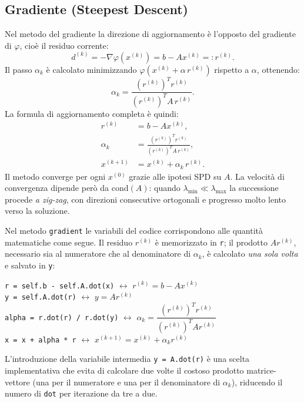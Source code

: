 \documentclass[a4paper,12pt]{article}
\begin{document}
\subsection{Gradiente (Steepest Descent)}
\label{subsec:grad}
 
Nel metodo del gradiente la direzione di aggiornamento è l'opposto del
gradiente di $\varphi$, cioè il residuo corrente:
\begin{equation}
    d^{(k)} = -\nabla\varphi(x^{(k)}) = b - Ax^{(k)} =: r^{(k)}.
\end{equation}
Il passo $\alpha_k$ è calcolato minimizzando $\varphi(x^{(k)} + \alpha\,r^{(k)})$
rispetto a $\alpha$, ottenendo:
\begin{equation}
    \alpha_k = \frac{(r^{(k)})^T r^{(k)}}{(r^{(k)})^T A\, r^{(k)}}.
    \label{eq:alpha_grad}
\end{equation}
La formula di aggiornamento completa è quindi:
\begin{align}
    r^{(k)}   &= b - A x^{(k)}, \\
    \alpha_k  &= \frac{(r^{(k)})^T r^{(k)}}{(r^{(k)})^T A\, r^{(k)}}, \\
    x^{(k+1)} &= x^{(k)} + \alpha_k\, r^{(k)}.
    \label{eq:grad_update}
\end{align}
Il metodo converge per ogni $x^{(0)}$ grazie alle ipotesi SPD su $A$. La velocità di convergenza dipende però da
$\mathrm{cond}(A)$: quando $\lambda_{\min} \ll \lambda_{\max}$ la successione
procede \emph{a zig-zag}, con direzioni consecutive ortogonali e progresso
molto lento verso la soluzione.

\begin{implbox}
Nel metodo \texttt{gradient} le variabili del codice corrispondono alle
quantità matematiche come segue. Il residuo $r^{(k)}$ è memorizzato in
\texttt{r}; il prodotto $Ar^{(k)}$, necessario sia al numeratore che al
denominatore di $\alpha_k$, è calcolato \emph{una sola volta} e salvato in
\texttt{y}:
\begin{center}
\texttt{r = self.b - self.A.dot(x)} \quad $\longleftrightarrow$ \quad $r^{(k)} = b - Ax^{(k)}$ \\[4pt]
\texttt{y = self.A.dot(r)} \quad $\longleftrightarrow$ \quad $y = Ar^{(k)}$ \\[4pt]
\texttt{alpha = r.dot(r) / r.dot(y)} \quad $\longleftrightarrow$ \quad $\alpha_k = \dfrac{(r^{(k)})^T r^{(k)}}{(r^{(k)})^T A r^{(k)}}$ \\[4pt]
\texttt{x = x + alpha * r} \quad $\longleftrightarrow$ \quad $x^{(k+1)} = x^{(k)} + \alpha_k r^{(k)}$
\end{center}
L'introduzione della variabile intermedia \texttt{y = A.dot(r)} è una scelta
implementativa che evita di calcolare due volte il costoso prodotto
matrice-vettore (una per il numeratore e una per il denominatore di
$\alpha_k$), riducendo il numero di \texttt{dot} per iterazione da tre a due.
\end{implbox}
 
\end{document}

